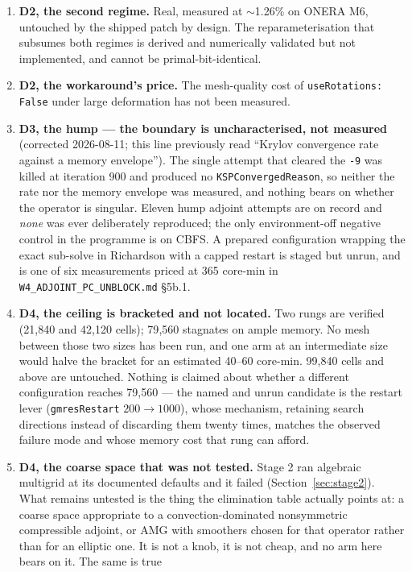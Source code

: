 \documentclass[11pt,a4paper]{article}
\begin{document}
\begin{enumerate}
only, and is stated conditionally throughout.
\item \textbf{D2, the second regime.} Real, measured at \(\sim\)1.26\% on ONERA M6, untouched
by the shipped patch by design. The reparameterisation that subsumes both regimes is derived
and numerically validated but not implemented, and cannot be primal-bit-identical.
\item \textbf{D2, the workaround's price.} The mesh-quality cost of \texttt{useRotations:
False} under large deformation has not been measured.
\item \textbf{D3, the hump --- the boundary is uncharacterised, not measured} (corrected
2026-08-11; this line previously read ``Krylov convergence rate against a memory envelope'').
The single attempt that cleared the \texttt{-9} was killed at iteration 900 and produced no
\texttt{KSPConvergedReason}, so neither the rate nor the memory envelope was measured, and
nothing bears on whether the operator is singular. Eleven hump adjoint attempts are on
record and \emph{none} was ever deliberately reproduced; the only environment-off negative
control in the programme is on CBFS. A prepared configuration wrapping the exact sub-solve in
Richardson with a capped restart is staged but unrun, and is one of six measurements priced
at 365 core-min in \texttt{W4\_ADJOINT\_PC\_UNBLOCK.md} \S5b.1.
\item \textbf{D4, the ceiling is bracketed and not located.} Two rungs are verified
(21{,}840 and 42{,}120 cells); 79{,}560 stagnates on ample memory. No mesh between those two
sizes has been run, and one arm at an intermediate size would halve the bracket for an
estimated 40--60 core-min. 99{,}840 cells and above are untouched. Nothing is claimed about
whether a different configuration reaches 79{,}560 --- the named and unrun candidate is the
restart lever (\texttt{gmresRestart} \(200\rightarrow1000\)), whose mechanism, retaining
search directions instead of discarding them twenty times, matches the observed failure mode
and whose memory cost that rung can afford.
\item \textbf{D4, the coarse space that was not tested.} Stage 2 ran algebraic multigrid at its
documented defaults and it failed (Section~\ref{sec:stage2}). What remains untested is the thing
the elimination table actually points at: a coarse space appropriate to a convection-dominated
nonsymmetric compressible adjoint, or AMG with smoothers chosen for that operator rather than for
an elliptic one. It is not a knob, it is not cheap, and no arm here bears on it. The same is true

\end{enumerate}
\end{document}
